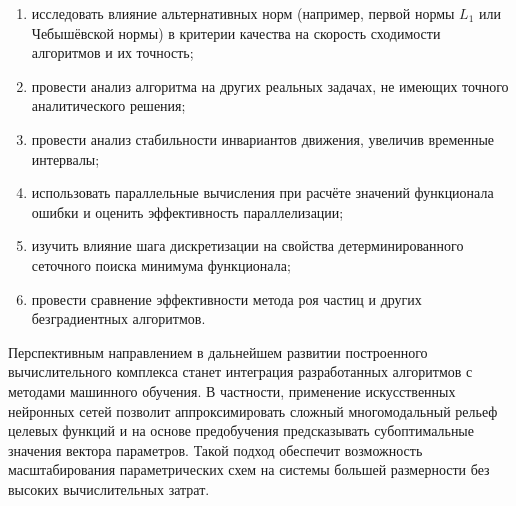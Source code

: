 \begin{enumerate}
	\item исследовать влияние альтернативных норм (например, первой нормы $L_1$ или Чебышёвской нормы) в критерии качества на скорость сходимости алгоритмов и их точность;
	\item провести анализ алгоритма на других реальных задачах, не имеющих точного аналитического решения;
	\item провести анализ стабильности инвариантов движения, увеличив временные интервалы;
	\item использовать параллельные вычисления при расчёте значений функционала ошибки и оценить эффективность параллелизации;
	\item изучить влияние шага дискретизации на свойства детерминированного сеточного поиска минимума функционала;
	\item провести сравнение эффективности метода роя частиц и других безградиентных алгоритмов.
\end{enumerate}

Перспективным направлением в дальнейшем развитии построенного вычислительного комплекса станет интеграция разработанных алгоритмов с методами машинного обучения. В частности, применение искусственных нейронных сетей позволит аппроксимировать сложный многомодальный рельеф целевых функций и на основе предобучения предсказывать субоптимальные значения вектора параметров. Такой подход обеспечит возможность масштабирования параметрических схем на системы большей размерности без высоких вычислительных затрат.
